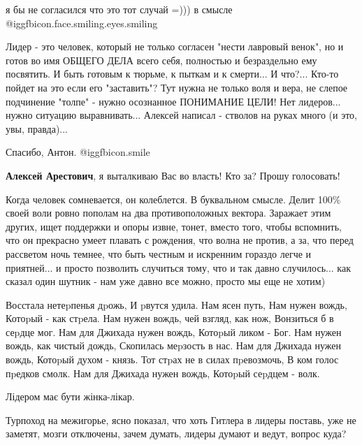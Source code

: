 \begin{itemize}
я бы не согласился что это тот случай =))) в смысле
@igg{fbicon.face.smiling.eyes.smiling} 


Лидер - это человек, который не только согласен "нести лавровый венок", но и
готов во имя ОБЩЕГО ДЕЛА всего себя, полностью и безраздельно ему посвятить. И
быть готовым к тюрьме, к пыткам и к смерти... И что?... Кто-то пойдет на это
если его "заставить"? Тут нужна не только воля и вера, не слепое подчинение
"толпе" - нужно осознанное ПОНИМАНИЕ ЦЕЛИ! Нет лидеров... нужно ситуацию
выравнивать... Алексей написал - стволов на руках много (и это, увы, правда)...

Спасибо, Антон. @igg{fbicon.smile} 

\textbf{Алексей Арестович}, я выталкиваю Вас во власть! Кто за? Прошу голосовать!


Когда человек сомневается, он колеблется. В буквальном смысле. Делит 100\% своей
воли ровно пополам на два противоположных вектора. Заражает этим других, ищет
поддержки и опоры извне, тонет, вместо того, чтобы вспомнить, что он прекрасно
умеет плавать с рождения, что волна не против, а за, что перед рассветом ночь
темнее, что быть честным и искренним гораздо легче и приятней... и просто
позволить случиться тому, что и так давно случилось... как сказал один шутник -
нам уже давно все можно, просто мы еще не хотим)


\obeycr
Восстала нетеpпенья дpожь,
И pвутся удила.
Нам ясен путь,
Нам нужен вождь,
Котоpый - как стpела.
Нам нужен вождь, чей взгляд, как нож,
Вонзиться б в сеpдце мог.
Нам для Джихада нужен вождь,
Котоpый ликом - Бог.
Нам нужен вождь, как чистый дождь,
Скопилась меpзость в нас.
Нам для Джихада нужен вождь,
Котоpый духом - князь.
Тот стpах не в силах пpевозмочь,
В ком голос пpедков смолк.
Нам для Джихада нужен вождь,
Котоpый сеpдцем - волк.
\restorecr


Лідером має бути жінка-лікар.


Турпоход на межигорье, ясно показал, что хоть Гитлера в лидеры поставь, уже не
заметят, мозги отключены, зачем думать, лидеры думают и ведут, вопрос куда?


\end{itemize}
